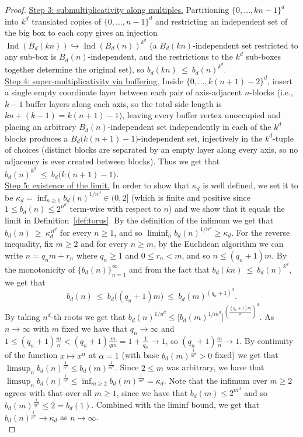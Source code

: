 \documentclass{article}
\theoremstyle{plain}
\theoremstyle{definition}
\theoremstyle{remark}
\DeclareMathOperator{\Ind}{Ind}
\begin{document}
\begin{proof}
\underline{Step 3: submultiplicativity along multiples.} Partitioning $\{0,\dots,kn-1\}^d$ into $k^d$ translated copies of $\{0,\dots,n-1\}^d$ and restricting an independent set of the big box to each copy gives an injection $\Ind(B_d(kn))\hookrightarrow\Ind(B_d(n))^{k^d}$ (a $B_d(kn)$-independent set restricted to any sub-box is $B_d(n)$-independent, and the restrictions to the $k^d$ sub-boxes together determine the original set), so $b_d(kn)\ \le\ b_d(n)^{k^d}$.\\

\underline{Step 4: super-multiplicativity via buffering.} Inside $\{0,\dots,k(n+1)-2\}^d$, insert a single empty coordinate layer between each pair of axis-adjacent $n$-blocks (i.e., $k-1$ buffer layers along each axis, so the total side length is $kn+(k-1)=k(n+1)-1$), leaving every buffer vertex unoccupied and placing an arbitrary $B_d(n)$-independent set independently in each of the $k^d$ blocks produces a $B_d\big(k(n+1)-1\big)$-independent set, injectively in the $k^d$-tuple of choices (distinct blocks are separated by an empty layer along every axis, so no adjacency is ever created between blocks). Thus we get that $b_d(n)^{k^d}\ \le\ b_d\big(k(n+1)-1\big)$.\\

\underline{Step 5: existence of the limit.} In order to show that $\kappa_d$ is well defined, we set it to be $\kappa_d=\inf_{n\ge1}b_d(n)^{1/n^d}\in(0,2]$ (which is finite and positive since $1\le b_d(n)\le 2^{n^d}$ term-wise with respect to $n$) and we show that it equals the limit in  Definition~\ref{def:torus}. By the definition of the infimum we get that $b_d(n)\ \ge\ \kappa_d^{\,n^d}$ for every $n \geq 1$, and so $\liminf_n b_d(n)^{1/n^d}\ge\kappa_d$. For the reverse inequality, fix $m\ge2$ and for every $n\ge m$, by the Euclidean algorithm we can write $n=q_n m+r_n$ where $q_n\ge1$ and $0\le r_n<m$, and so $n\le(q_n+1)m$. By the monotonicity of $\{b_d(n)\}_{n=1}^\infty$ and from the fact that $b_d(kn)\ \le\ b_d(n)^{k^d}$, we get that 
\[
b_d(n)\ \le\ b_d\big((q_n+1)m\big)\ \le\ b_d(m)^{(q_n+1)^d}.
\]
By taking $n^d$-th roots we get that $b_d(n)^{1/n^d}\le \big[b_d(m)^{1/m^d}\big]^{(\frac{(q_n+1)m}{n})^d}$. As $n\to\infty$ with $m$ fixed we have that $q_n\to\infty$ and $1\le(q_n+1)\frac{m}{n}<(q_n+1)\frac{m}{qm}=1+\frac{1}{q_n}\to1$, so $(q_n+1)\frac{m}{n}\to1$. By continuity of the function $x\mapsto x^\alpha$ at $\alpha=1$ (with base $b_d(m)^{\frac{1}{m^d}}>0$ fixed) we get that $\limsup_n b_d(n)^{\frac{1}{n^d}}\le b_d(m)^{\frac{1}{m^d}}$. Since $2\le m$ was arbitrary, we have that $\limsup_n b_d(n)^{\frac{1}{n^d}}\le\inf_{m\ge2}b_d(m)^{\frac{1}{m^d}}=\kappa_d$. Note that the infimum over $m\ge2$ agrees with that over all $m\ge1$, since we have that $b_d(m) \leq 2^{m^d}$ and so $b_d(m)^{\frac{1}{m^d}} \leq 2 =b_d(1)$. Combined with the liminf bound, we get that $b_d(n)^{\frac{1}{n^d}}\to\kappa_d$ as $n\to\infty$.\\ 


\end{proof}
\end{document}

